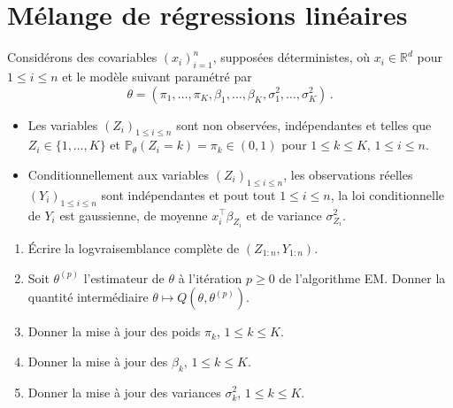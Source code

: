 \documentclass[a4paper,10pt,fleqn]{article}
\newcommand{\eqsp}{\,}
\newcommand{\1}{\ensuremath{\mathbbm{1}}}
\begin{document}
\section*{M\'elange de r\'egressions lin\'eaires}

Consid\'erons des covariables $(x_i)_{i=1}^n$, suppos\'ees d\'eterministes,  o\`u $x_i\in\mathbb{R}^d$ pour $1\leq i \leq n$ et le mod\`ele suivant param\'etr\'e par 
$$
\theta=(\pi_1,\dots,\pi_K,\beta_1,\dots,\beta_K,\sigma_1^2,\dots,\sigma_K^2)\eqsp.
$$
\begin{itemize}
\item Les variables $(Z_i)_{1\leq i \leq n}$ sont non observ\'ees, ind\'ependantes et telles que $Z_i\in\{1,\ldots,K\}$ et  $\mathbb{P}_\theta(Z_i= k) = \pi_k\in (0,1)$ pour $1\leq k \leq K$, $1\leq i \leq n$.
\item Conditionnellement aux variables  $(Z_i)_{1\leq i \leq n}$, les observations r\'eelles $(Y_i)_{1\leq i \leq n}$ sont ind\'ependantes et pout tout $1\leq i\leq n$, la loi conditionnelle de $Y_i$ est gaussienne, de moyenne $x_i^\top\beta_{Z_i}$ et de variance $\sigma_{Z_i}^2$.
\end{itemize}


\begin{enumerate}
\item \'Ecrire la logvraisemblance compl\`ete de $(Z_{1:n},Y_{1:n})$.


\item Soit $\theta^{(p)}$ l'estimateur de $\theta$ \`a l'it\'eration $p\geq 0$ de l'algorithme EM.  Donner la quantit\'e interm\'ediaire $\theta\mapsto Q(\theta,\theta^{(p)})$.

\item Donner la mise \`a jour des poids $\pi_k$, $1\leq k \leq K$.

\item Donner la mise \`a jour des  $\beta_k$, $1\leq k \leq K$.

\item Donner la mise \`a jour des variances $\sigma_k^2$, $1\leq k \leq K$.


\end{enumerate}
\end{document}

